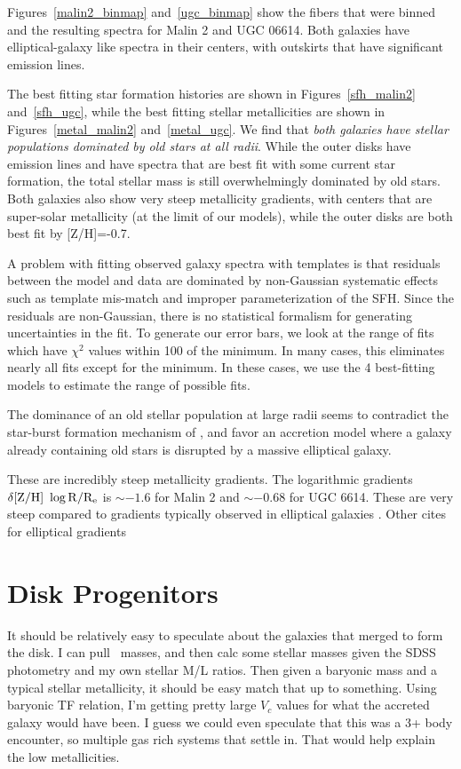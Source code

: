 \documentclass[12pt,preprint]{aastex}
\newcommand\HI{\ion{H}{1}}
\begin{document}
Figures~\ref{malin2_binmap} and~\ref{ugc_binmap} show the fibers that were binned and the resulting spectra for Malin 2 and UGC 06614.  Both galaxies have elliptical-galaxy like spectra in their centers, with outskirts that have significant emission lines.  


The best fitting star formation histories are shown in Figures~\ref{sfh_malin2} and~\ref{sfh_ugc}, while the best fitting stellar metallicities are shown in Figures~\ref{metal_malin2} and~\ref{metal_ugc}.  We find that {\emph{both galaxies have stellar populations dominated by old stars at all radii}}.  While the outer disks have emission lines and have spectra that are best fit with some current star formation, the total stellar mass is still overwhelmingly dominated by old stars.  Both galaxies also show very steep metallicity gradients, with centers that are super-solar metallicity (at the limit of our models), while the outer disks are both best fit by [Z/H]=-0.7.  

A problem with fitting observed galaxy spectra with templates is that residuals between the model and data are dominated by non-Gaussian systematic effects such as template mis-match and improper parameterization of the SFH.  Since the residuals are non-Gaussian, there is no statistical formalism for generating uncertainties in the fit.  To generate our error bars, we look at the range of fits which have $\chi^2$ values within 100 of the minimum.  In many cases, this eliminates nearly all fits except for the minimum.  In these cases, we use the 4 best-fitting models to estimate the range of possible fits.  

The dominance of an old stellar population at large radii seems to contradict the star-burst formation mechanism of \citet{Mapelli08}, and favor an accretion model where a galaxy already containing old stars is disrupted by a massive elliptical galaxy.  


These are incredibly steep metallicity gradients.  The logarithmic gradients $\delta \rm{[Z/H]}\ \log{R/R_e}$ is $\sim -1.6$ for Malin 2 and $\sim -0.68$ for UGC 6614.  These are very steep compared to gradients typically observed in elliptical galaxies \citep{Greene12, Greene15}.  Other cites for elliptical gradients \citep{Kuntschner10}

\section{Disk Progenitors}

It should be relatively easy to speculate about the galaxies that merged to form the disk. I can pull \HI\ masses, and then calc some stellar masses given the SDSS photometry and my own stellar M/L ratios.  Then given a baryonic mass and a typical stellar metallicity, it should be easy match that up to something.  Using baryonic TF relation, I'm getting pretty large $V_c$ values for what the accreted galaxy would have been.  I guess we could even speculate that this was a 3+ body encounter, so multiple gas rich systems that settle in.  That would help explain the low metallicities.  
\end{document}
